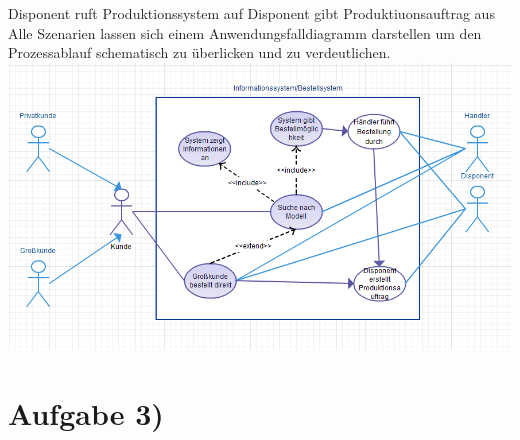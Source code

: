 \documentclass{swp1}
\begin{document}
Disponent ruft Produktionssystem auf\newline
Disponent gibt Produktiuonsauftrag aus\newline
\newline
Alle Szenarien lassen sich einem Anwendungsfalldiagramm darstellen um den Prozessablauf schematisch zu überlicken und zu verdeutlichen.\newline
\newline
\includegraphics[scale=0.75]{Diagramm}
\newline

\section*{Aufgabe 3)}
\end{document}
